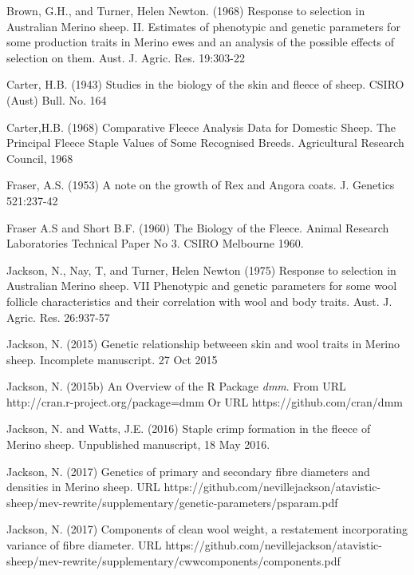 \documentclass[titlepage]{article}  %
\begin{document}
\clearpage
\begin{thebibliography}{99}

Brown, G.H., and Turner, Helen Newton. (1968) Response to selection in Australian Merino sheep. II. Estimates of phenotypic and genetic parameters for some production traits in Merino ewes and an analysis of the possible effects of selection on them. Aust. J. Agric. Res. 19:303-22

Carter, H.B. (1943) Studies in the biology of the skin and fleece of sheep. CSIRO (Aust) Bull. No. 164

Carter,H.B. (1968) Comparative Fleece Analysis Data for Domestic Sheep. The Principal Fleece Staple Values of Some Recognised Breeds. Agricultural Research Council, 1968
 
Fraser, A.S. (1953) A note on the growth of Rex and Angora coats. J. Genetics 521:237-42

Fraser A.S and Short B.F. (1960) The Biology of the Fleece. Animal Research Laboratories Technical Paper No 3. CSIRO Melbourne 1960.

Jackson, N., Nay, T, and Turner, Helen Newton (1975) Response to selection in Australian Merino sheep. VII Phenotypic and genetic parameters for some wool follicle characteristics and their correlation with wool and body traits. Aust. J. Agric. Res. 26:937-57

Jackson, N. (2015) Genetic relationship betweeen skin and wool traits in Merino sheep. Incomplete manuscript. 27 Oct 2015

Jackson, N. (2015b) An Overview of the R Package {\em dmm}. From URL http://cran.r-project.org/package=dmm  Or URL https://github.com/cran/dmm

Jackson, N. and Watts, J.E. (2016) Staple crimp formation in the fleece of Merino sheep. Unpublished manuscript, 18 May 2016.


Jackson, N. (2017) Genetics of primary and secondary fibre diameters and densities in Merino sheep. URL https://github.com/nevillejackson/atavistic-sheep/mev-rewrite/supplementary/genetic-parameters/psparam.pdf

Jackson, N. (2017) Components of clean wool weight, a restatement incorporating variance of fibre diameter. URL https://github.com/nevillejackson/atavistic-sheep/mev-rewrite/supplementary/cwwcomponents/components.pdf


\end{thebibliography}
\end{document}
